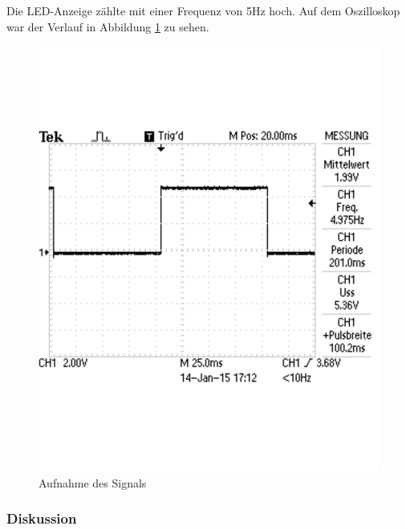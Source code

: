 \documentclass[12pt,a4paper]{article}
\begin{document}
Die LED-Anzeige zählte mit einer Frequenz von 5Hz hoch. Auf dem Oszilloskop war der Verlauf in Abbildung \ref{fig:o_2} zu sehen.

\begin{figure}[H] 
  \centering 	
    \includegraphics[trim = 0mm 50mm 0mm 50mm, clip, scale = 0.4]{TEK0015.pdf}
  	\caption[Aufnahme des Signals]{Aufnahme des Signals} 
  \label{fig:o_2}
\end{figure}

\subsubsection*{Diskussion}
\end{document}

